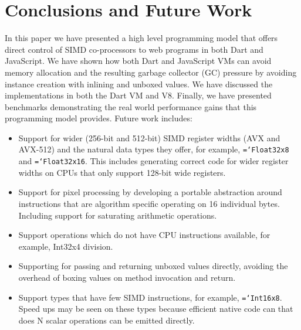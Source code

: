 \documentclass{sigplanconf}
\newcommand{\ttt}[1]{{\texttt{\hyphenchar\font=`\-\relax #1}}}%
\begin{document}
\section{Conclusions and Future Work}

In this paper we have presented a high level programming model that offers
direct control of SIMD co-processors to web programs in both Dart and
JavaScript. We have shown how both Dart and JavaScript VMs can avoid memory
allocation and the resulting garbage collector (GC) pressure by avoiding
instance creation with inlining and unboxed values. We have discussed the
implementations in both the Dart VM and V8. Finally, we have presented
benchmarks demonstrating the real world performance gains that this programming
model provides. Future work includes:

\begin{itemize}
\item
Support for wider (256-bit and 512-bit) SIMD register widths (AVX and AVX-512)
and the natural data types they offer, for example, \ttt{Float32x8} and
\ttt{Float32x16}. This includes generating correct code for wider register
widths on CPUs that only support 128-bit wide registers.

\item
Support for pixel processing by developing a portable abstraction around
instructions that are algorithm specific operating on 16 individual bytes.
Including support for saturating arithmetic operations.

\item
Support operations which do not have CPU instructions available, for example,
Int32x4 division.

\item
Supporting for passing and returning unboxed values directly, avoiding the
overhead of boxing values on method invocation and return.

\item
Support types that have few SIMD instructions, for example, \ttt{Int16x8}. Speed
ups may be seen on these types because efficient native code can that does N
scalar operations can be emitted directly.

\end{itemize}



\end{document}
